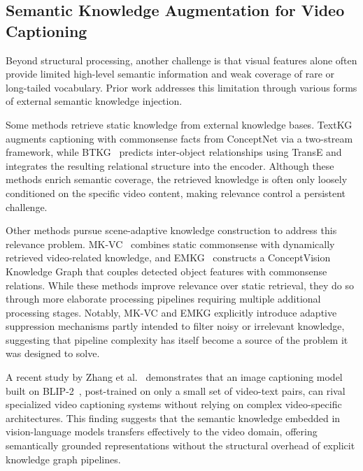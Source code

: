 \subsection{Semantic Knowledge Augmentation for Video Captioning}
\label{subsec:subsec_22_semantic}
Beyond structural processing, another challenge is that visual features alone often provide limited high-level semantic information and weak coverage of rare or long-tailed vocabulary. Prior work addresses this limitation through various forms of external semantic knowledge injection.

Some methods retrieve static knowledge from external knowledge bases. TextKG~\cite{guTextKnowledgeGraph2023} augments captioning with commonsense facts from ConceptNet via a two-stream framework, while BTKG~\cite{zhongBidirectionalTransformerKnowledge2024} predicts inter-object relationships using TransE and integrates the resulting relational structure into the encoder. Although these methods enrich semantic coverage, the retrieved knowledge is often only loosely conditioned on the specific video content, making relevance control a persistent challenge.

Other methods pursue scene-adaptive knowledge construction to address this relevance problem. MK-VC~\cite{sunSceneAdaptiveDynamic2026} combines static commonsense with dynamically retrieved video-related knowledge, and EMKG~\cite{sunGeneralizedVideoCaptioning2026} constructs a ConceptVision Knowledge Graph that couples detected object features with commonsense relations. While these methods improve relevance over static retrieval, they do so through more elaborate processing pipelines requiring multiple additional processing stages. Notably, MK-VC and EMKG explicitly introduce adaptive suppression mechanisms partly intended to filter noisy or irrelevant knowledge, suggesting that pipeline complexity has itself become a source of the problem it was designed to solve.

A recent study by Zhang et al.~\cite{zhangPretrainedImageTextModels2025} demonstrates that an image captioning model built on \mbox{BLIP-2~\cite{liBLIP2BootstrappingLanguageImage2023}}, post-trained on only a small set of video-text pairs, can rival specialized video captioning systems without relying on complex video-specific architectures. This finding suggests that the semantic knowledge embedded in vision-language models transfers effectively to the video domain, offering semantically grounded representations without the structural overhead of explicit knowledge graph pipelines.


